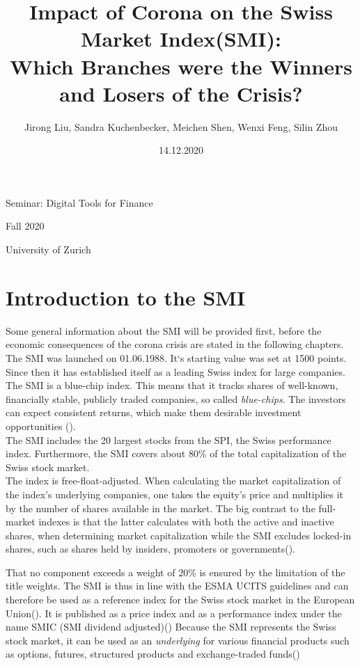 \documentclass[11pt,a4paper]{article}
\title{\textbf{Impact of Corona on the Swiss Market Index(SMI): \\ 
Which Branches were the Winners and Losers of the Crisis?}}
\author{Jirong Liu, Sandra Kuchenbecker, Meichen Shen, Wenxi Feng, Silin Zhou}
\date{14.12.2020}
\begin{document}
\maketitle
\centerline{Seminar: Digital Tools for Finance}
\centerline{Fall 2020}
\centerline{University of Zurich}
\tableofcontents
\newpage
\section{Introduction to the SMI}
Some general information about the SMI will be provided first, before the economic consequences of the corona crisis are stated in the following chapters. \\

\noindent The SMI was launched on 01.06.1988. It`s starting value was set at 1500 points. Since then it has established itself as a leading Swiss index for large companies.\\
The SMI is a blue-chip index. This means that it tracks shares of well-known, financially stable, publicly traded companies, so called \emph{blue-chips}. The investors can expect consistent returns, which make them desirable investment opportunities (\cite{JamesChen2019}).\\

\noindent The SMI includes the 20 largest stocks from the SPI, the Swiss performance index. Furthermore, the SMI covers about 80\% of the total capitalization of the Swiss stock market.\\
The index is free-float-adjusted. When calculating the market capitalization of the index's underlying companies, one takes the equity's price and multiplies it by the number of shares available in the market. The big contrast to the full-market indexes is that the latter calculates with both the active and inactive shares, when determining market capitalization while the SMI excludes locked-in shares, such as shares held by insiders, promoters or governments(\cite{JamesChen(2020)}).

\noindent That no component exceeds a weight of 20\%  is ensured by the limitation of the title weights. The SMI is thus in line with the ESMA UCITS guidelines and can therefore be used as a reference index for the Swiss stock market in the European Union(\cite{SIXSwissExchangeAG}).
It is published as a price index and as a performance index under the name SMIC (SMI dividend adjusted)(\cite{SIXSwissExchangeAG})
\noindent Because the SMI represents the Swiss stock market, it can be used as an \emph{underlying} for various financial products such as options, futures, structured products and exchange-traded funds(\cite{SIXSwissExchangeAG})
\end{document}
